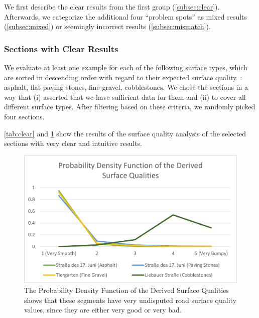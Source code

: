 We first describe the clear results from the first group (\cref{subsec:clear}).
Afterwards, we categorize the additional four ``problem spots'' as mixed results (\cref{subsec:mixed}) or seemingly incorrect results (\cref{subsec:mismatch}).


\subsubsection{Sections with Clear Results}
\label{subsubsec:sections_with_clear_results}
We evaluate at least one example for each of the following surface types, which are sorted in descending order with regard to their expected surface quality~\cite{titov2019monitoring}: asphalt, flat paving stones, fine gravel, cobblestones.
We chose the sections in a way that (i) asserted that we have sufficient data for them and (ii) to cover all different surface types.
After filtering based on these criteria, we randomly picked four sections.

\cref{tab:clear} and \cref{fig:clear} show the results of the surface quality analysis of the selected sections with very clear and intuitive results.

\begin{figure}
    \centering
    \includegraphics[width=\columnwidth]{fig/pdf_clear.png}
    \caption{%
        The Probability Density Function of the Derived Surface Qualities shows that these segments have very undisputed road surface quality values, since they are either very good or very bad.
    }%
    \label{fig:clear}
\end{figure}

